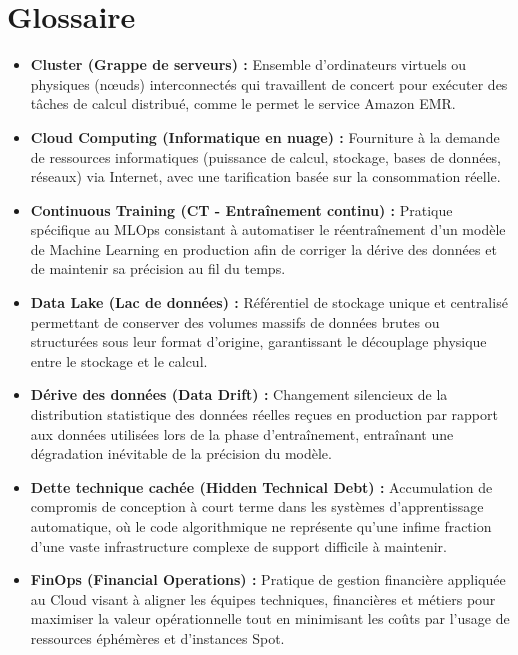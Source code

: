 
\chapter*{Glossaire}
\adjustmtc

\begin{itemize}
    \item[$\bullet$] \textbf{Cluster (Grappe de serveurs) :} Ensemble d'ordinateurs virtuels ou physiques (nœuds) interconnectés qui travaillent de concert pour exécuter des tâches de calcul distribué, comme le permet le service Amazon EMR.
    \item[$\bullet$] \textbf{Cloud Computing (Informatique en nuage) :} Fourniture à la demande de ressources informatiques (puissance de calcul, stockage, bases de données, réseaux) via Internet, avec une tarification basée sur la consommation réelle. %
    \item[$\bullet$] \textbf{Continuous Training (CT - Entraînement continu) :} Pratique spécifique au MLOps consistant à automatiser le réentraînement d'un modèle de Machine Learning en production afin de corriger la dérive des données et de maintenir sa précision au fil du temps. %
    \item[$\bullet$] \textbf{Data Lake (Lac de données) :} Référentiel de stockage unique et centralisé permettant de conserver des volumes massifs de données brutes ou structurées sous leur format d'origine, garantissant le découplage physique entre le stockage et le calcul. %
    \item[$\bullet$] \textbf{Dérive des données (Data Drift) :} Changement silencieux de la distribution statistique des données réelles reçues en production par rapport aux données utilisées lors de la phase d'entraînement, entraînant une dégradation inévitable de la précision du modèle. %
    \item[$\bullet$] \textbf{Dette technique cachée (Hidden Technical Debt) :} Accumulation de compromis de conception à court terme dans les systèmes d'apprentissage automatique, où le code algorithmique ne représente qu'une infime fraction d'une vaste infrastructure complexe de support difficile à maintenir. %
    \item[$\bullet$] \textbf{FinOps (Financial Operations) :} Pratique de gestion financière appliquée au Cloud visant à aligner les équipes techniques, financières et métiers pour maximiser la valeur opérationnelle tout en minimisant les coûts par l'usage de ressources éphémères et d'instances Spot. %

\end{itemize}
